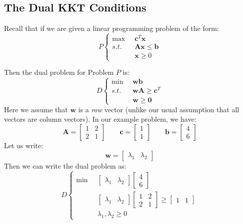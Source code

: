 \subsection{The Dual KKT Conditions}
Recall that if we are given a linear programming problem of the form:
\begin{equation}
P\left\{
\begin{aligned}
\max\;\; & \mathbf{c}^T\mathbf{x}\\
s.t.\;\; & \mathbf{A}\mathbf{x} \leq \mathbf{b}\\
& \mathbf{x} \geq 0
\end{aligned}\right.
\end{equation}

Then the dual problem for Problem $P$ is:
\begin{equation}
D\left\{
\begin{aligned}
\min\;\; & \mathbf{w}\mathbf{b}\\
s.t.\;\; & \mathbf{w}\mathbf{A} \geq \mathbf{c}^T\\
& \mathbf{w} \geq \mathbf{0}
\end{aligned}\right.
\end{equation}
Here we assume that $\mathbf{w}$ is a \textit{row} vector (unlike our usual assumption that all vectors are column vectors). In our example problem, we have:
\begin{displaymath}
\mathbf{A} = \begin{bmatrix}1 & 2\\2 & 1\end{bmatrix} \quad \quad \mathbf{c} = \begin{bmatrix}1\\1\end{bmatrix} \quad \quad \mathbf{b} = \begin{bmatrix}4\\6\end{bmatrix}
\end{displaymath}
Let us write:
\begin{displaymath}
\mathbf{w} = \begin{bmatrix} \lambda_1 & \lambda_2 \end{bmatrix}
\end{displaymath}
Then we can write the dual problem as:
\begin{displaymath}
D\left\{
\begin{aligned}
\min \;\; & \begin{bmatrix} \lambda_1 & \lambda_2 \end{bmatrix} \begin{bmatrix}4\\6\end{bmatrix} \\
& \begin{bmatrix} \lambda_1 & \lambda_2 \end{bmatrix} \begin{bmatrix}1 & 2\\2 & 1\end{bmatrix} \geq \begin{bmatrix}1 & 1\end{bmatrix}\\
& \lambda_1, \lambda_2 \geq 0
\end{aligned}
\right.
\end{displaymath}
